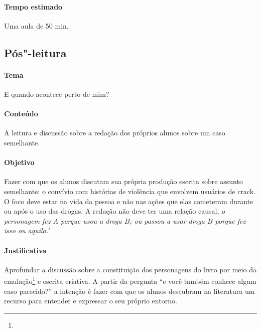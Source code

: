 \documentclass[12pt]{extarticle}
\begin{document}
\paragraph{Tempo estimado} Uma aula de 50 min. 


\subsection{Pós"-leitura}


\paragraph{Tema} E quando acontece perto de mim? 
\paragraph{Conteúdo} A leitura e discussão sobre a redação dos 
	próprios alunos sobre um caso semelhante. 
\paragraph{Objetivo} Fazer com que os alunos discutam sua própria produção escrita 
	sobre assunto semelhante: o convívio com histórias de violência que 
	envolvem usuários de crack. O foco deve estar na vida da pessoa e não 
	nas ações que elas cometeram durante ou após o uso das drogas. 
	A redação não deve ter uma relação causal, \textit{o personagem fez $A$ 
	porque usou a droga $B$; ou passou a usar droga $B$ porque fez isso ou aquilo.}"
\paragraph{Justificativa} Aprofundar a discussão sobre a constituição dos personagens 
	do livro por meio da emulação\footnote{} e escrita criativa. A partir 
	da pergunta ``e você também conhece algum caso parecido?'' a intenção 
	é fazer com que os alunos descubram na literatura um recurso para 
	entender e expressar o seu próprio entorno.
\end{document}
